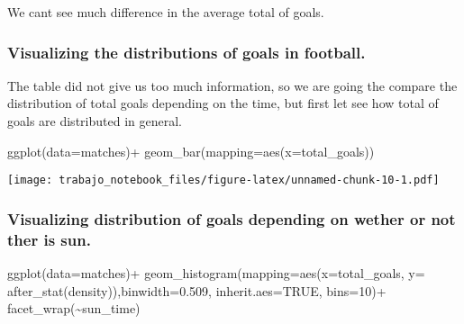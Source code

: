 \documentclass[
]{article}
\newenvironment{Shaded}{\begin{snugshade}}{\end{snugshade}}
\newcommand{\AttributeTok}[1]{\textcolor[rgb]{0.77,0.63,0.00}{#1}}
\newcommand{\ConstantTok}[1]{\textcolor[rgb]{0.00,0.00,0.00}{#1}}
\newcommand{\DecValTok}[1]{\textcolor[rgb]{0.00,0.00,0.81}{#1}}
\newcommand{\FloatTok}[1]{\textcolor[rgb]{0.00,0.00,0.81}{#1}}
\newcommand{\FunctionTok}[1]{\textcolor[rgb]{0.00,0.00,0.00}{#1}}
\newcommand{\NormalTok}[1]{#1}
\newcommand{\SpecialCharTok}[1]{\textcolor[rgb]{0.00,0.00,0.00}{#1}}
\begin{document}
We cant see much difference in the average total of goals.

\hypertarget{visualizing-the-distributions-of-goals-in-football.}{%
\subsubsection{Visualizing the distributions of goals in
football.}\label{visualizing-the-distributions-of-goals-in-football.}}

The table did not give us too much information, so we are going the
compare the distribution of total goals depending on the time, but first
let see how total of goals are distributed in general.

\begin{Shaded}
\begin{Highlighting}[]
\FunctionTok{ggplot}\NormalTok{(}\AttributeTok{data=}\NormalTok{matches)}\SpecialCharTok{+}
  \FunctionTok{geom\_bar}\NormalTok{(}\AttributeTok{mapping=}\FunctionTok{aes}\NormalTok{(}\AttributeTok{x=}\NormalTok{total\_goals))}
\end{Highlighting}
\end{Shaded}

\texttt{[image: trabajo\_notebook\_files/figure-latex/unnamed-chunk-10-1.pdf]}

\hypertarget{visualizing-distribution-of-goals-depending-on-wether-or-not-ther-is-sun.}{%
\subsubsection{Visualizing distribution of goals depending on wether or
not ther is
sun.}\label{visualizing-distribution-of-goals-depending-on-wether-or-not-ther-is-sun.}}

\begin{Shaded}
\begin{Highlighting}[]
\FunctionTok{ggplot}\NormalTok{(}\AttributeTok{data=}\NormalTok{matches)}\SpecialCharTok{+}
  \FunctionTok{geom\_histogram}\NormalTok{(}\AttributeTok{mapping=}\FunctionTok{aes}\NormalTok{(}\AttributeTok{x=}\NormalTok{total\_goals, }\AttributeTok{y=} \FunctionTok{after\_stat}\NormalTok{(density)),}\AttributeTok{binwidth=}\FloatTok{0.509}\NormalTok{, }\AttributeTok{inherit.aes=}\ConstantTok{TRUE}\NormalTok{, }\AttributeTok{bins=}\DecValTok{10}\NormalTok{)}\SpecialCharTok{+}
  \FunctionTok{facet\_wrap}\NormalTok{(}\SpecialCharTok{\textasciitilde{}}\NormalTok{sun\_time)}
\end{Highlighting}
\end{Shaded}
\end{document}
